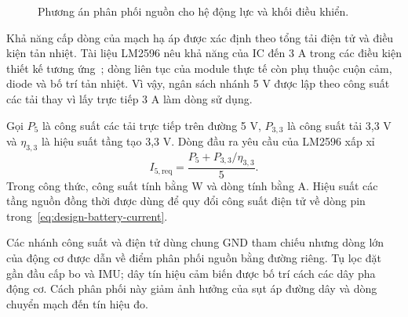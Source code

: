 \begin{figure}[htbp]
	\centering
	\resizebox{\linewidth}{!}{}
	\caption{Phương án phân phối nguồn cho hệ động lực và khối điều khiển.}
	\label{fig:design-power-distribution}
\end{figure}

Khả năng cấp dòng của mạch hạ áp được xác định theo tổng tải điện tử và điều kiện tản nhiệt. Tài liệu LM2596 nêu khả năng của IC đến 3 A trong các điều kiện thiết kế tương ứng~\cite{tiLm2596}; dòng liên tục của module thực tế còn phụ thuộc cuộn cảm, diode và bố trí tản nhiệt. Vì vậy, ngân sách nhánh 5 V được lập theo công suất các tải thay vì lấy trực tiếp 3 A làm dòng sử dụng.

Gọi $P_5$ là công suất các tải trực tiếp trên đường 5 V, $P_{3{,}3}$ là công suất tải 3,3 V và $\eta_{3{,}3}$ là hiệu suất tầng tạo 3,3 V. Dòng đầu ra yêu cầu của LM2596 xấp xỉ
\begin{equation}
	I_{5,\mathrm{req}}
	=\frac{P_5+P_{3{,}3}/\eta_{3{,}3}}{5}.
	\label{eq:design-logic-power-budget}
\end{equation}
Trong công thức, công suất tính bằng W và dòng tính bằng A. Hiệu suất các tầng nguồn đồng thời được dùng để quy đổi công suất điện tử về dòng pin trong~\eqref{eq:design-battery-current}.

Các nhánh công suất và điện tử dùng chung GND tham chiếu nhưng dòng lớn của động cơ được dẫn về điểm phân phối nguồn bằng đường riêng. Tụ lọc đặt gần đầu cấp bo và IMU; dây tín hiệu cảm biến được bố trí cách các dây pha động cơ. Cách phân phối này giảm ảnh hưởng của sụt áp đường dây và dòng chuyển mạch đến tín hiệu đo.
